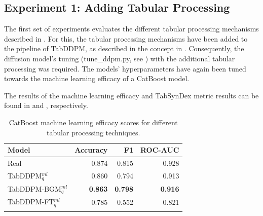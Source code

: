 \subsection{Experiment 1: Adding Tabular Processing}
\label{ch:Experiment-1}

The first set of experiments evaluates the different tabular processing mechanisms described in .
For this, the tabular processing mechanisms have been added to the pipeline of TabDDPM, as described in the concept in .
Consequently, the diffusion model's tuning (tune\_ddpm.py, see ) with the additional tabular processing was required.
The models' hyperparameters have again been tuned towards the machine learning efficacy of a CatBoost model.

The results of the machine learning efficacy and TabSynDex metric results can be found in  and , respectively.
\begin{table}[h]
	\centering
	\begin{tabular}{lrrr}
		\toprule
		\textbf{Model}         & \textbf{Accuracy} & \textbf{F1}    & \textbf{ROC-AUC} \\
		\midrule
		Real                   & 0.874              & 0.815          & 0.928            \\
		TabDDPM$^{ml}_{q}$     & 0.860              & 0.794          & 0.913            \\
		TabDDPM-BGM$^{ml}_{q}$ & \textbf{0.863}     & \textbf{0.798} & \textbf{0.916}   \\
		TabDDPM-FT$^{ml}_{q}$  & 0.785              & 0.552          & 0.821            \\
		\bottomrule
		\multicolumn{4}{c}{}\\[-0.6em]
	\end{tabular}
	\caption[Experiment 1 ML-Efficacy]{CatBoost machine learning efficacy scores for different tabular processing techniques.}
	\label{tab:exp1-ml}
\end{table}

